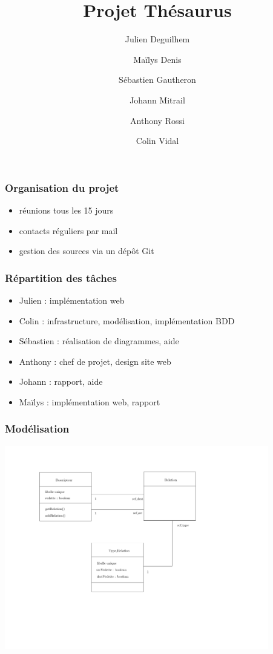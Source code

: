 \documentclass{beamer}
\author{Julien Deguilhem\and Maïlys Denis\and Sébastien Gautheron\and Johann Mitrail\and Anthony Rossi\and Colin Vidal}
\date{}
\begin{document}
 
\title{Projet Thésaurus}
\maketitle




\begin{frame}
\frametitle{Organisation du projet}
\begin{itemize}
\item réunions tous les 15 jours
\item contacts réguliers par mail
\item gestion des sources via un dépôt Git
\end{itemize}
\end{frame}


\begin{frame}
\frametitle{Répartition des tâches}
\begin{itemize}
\item Julien : implémentation web
\item Colin : infrastructure, modélisation, implémentation BDD
\item Sébastien : réalisation de diagrammes, aide
\item Anthony : chef de projet, design site web
\item Johann : rapport, aide
\item Maïlys : implémentation web, rapport
\end{itemize}
\end{frame}


\begin{frame}
\frametitle{Modélisation}
\begin{center}
\includegraphics[width=11.5cm, trim = 2cm 1cm 4cm 3cm]{diag_de_classe.pdf}
\end{center}
\end{frame}
\end{document}
